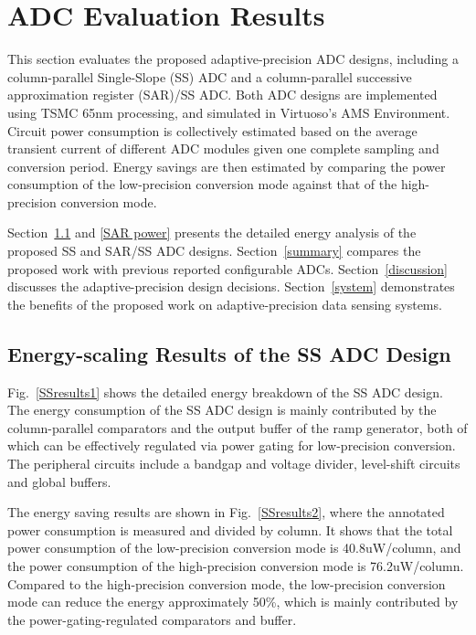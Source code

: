 \section{ADC Evaluation Results}\label{result}

This section evaluates the proposed adaptive-precision ADC 
designs, including a column-parallel Single-Slope (SS) ADC and a column-parallel successive 
approximation register (SAR)/SS ADC. Both ADC designs are implemented using TSMC 65nm processing,
and simulated in Virtuoso’s AMS Environment. Circuit power consumption is collectively estimated
based on the average transient current of different ADC modules given one complete sampling and 
conversion period. Energy savings are then estimated by comparing the power consumption of the
low-precision conversion mode against that of the high-precision conversion mode. 

Section~\ref{SS power} and \ref{SAR power} presents the detailed energy analysis of the 
proposed SS and SAR/SS ADC designs. 
Section~\ref{summary} compares the proposed work with previous reported configurable ADCs.
Section~\ref{discussion} discusses the adaptive-precision design decisions. 
Section~\ref{system} demonstrates the benefits of the proposed work on adaptive-precision data sensing 
systems.

\subsection{Energy-scaling Results of the SS ADC Design}\label{SS power}

Fig.~\ref{SSresults1} shows the detailed energy breakdown of the SS ADC design. 
The energy consumption of the SS ADC design is mainly contributed by the column-parallel comparators 
and the output buffer of the ramp generator, both of which can be effectively regulated via power gating 
for low-precision conversion. The peripheral circuits include a bandgap and voltage divider, level-shift 
circuits and global buffers.

The energy saving results are shown in Fig.~\ref{SSresults2}, where the annotated power consumption is measured 
and divided by column. It shows that the total power consumption of the low-precision conversion mode is 
40.8uW/column, and the power consumption of the high-precision conversion mode is 76.2uW/column. 
Compared to the high-precision conversion mode, the low-precision conversion mode can reduce the energy approximately 
50\%, which is mainly contributed by the power-gating-regulated comparators and buffer.

